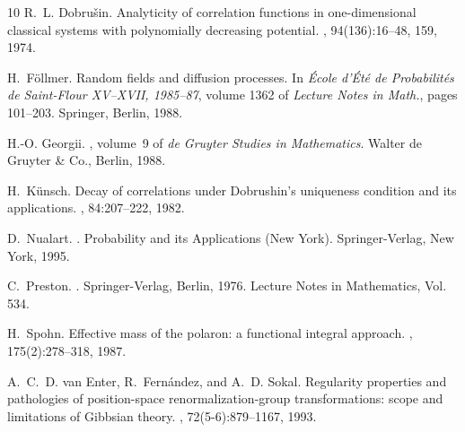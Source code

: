\documentclass[a4paper,12pt,reqno]{amsart}
\begin{document}
\begin{thebibliography}{10}
R.~L. Dobru{\v{s}}in.
\newblock Analyticity of correlation functions in one-dimensional classical
  systems with polynomially decreasing potential.
, 94(136):16--48, 159, 1974.

H.~F{\"o}llmer.
\newblock Random fields and diffusion processes.
\newblock In {\em \'Ecole d'\'Et\'e de Probabilit\'es de Saint-Flour XV--XVII,
  1985--87}, volume 1362 of {\em Lecture Notes in Math.}, pages 101--203.
  Springer, Berlin, 1988.

H.-O. Georgii.
, volume~9 of {\em de
  Gruyter Studies in Mathematics}.
\newblock Walter de Gruyter \& Co., Berlin, 1988.

H.~K{\"u}nsch.
\newblock Decay of correlations under {D}obrushin's uniqueness condition and
  its applications.
, 84:207--222, 1982.

D.~Nualart.
.
\newblock Probability and its Applications (New York). Springer-Verlag, New
  York, 1995.

C.~Preston.
.
\newblock Springer-Verlag, Berlin, 1976.
\newblock Lecture Notes in Mathematics, Vol. 534.

H.~Spohn.
\newblock Effective mass of the polaron: a functional integral approach.
, 175(2):278--318, 1987.

A.~C.~D. van Enter, R.~Fern{\'a}ndez, and A.~D. Sokal.
\newblock Regularity properties and pathologies of position-space
  renormalization-group transformations: scope and limitations of {G}ibbsian
  theory.
, 72(5-6):879--1167, 1993.

\end{thebibliography}
\end{document}

